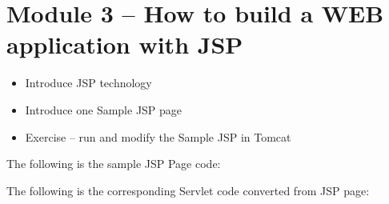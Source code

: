 \section{Module 3 -- How to build a WEB application with JSP
}
\begin{itemize}
\item Introduce JSP technology
\item Introduce one Sample JSP page
\item Exercise -- run and modify the Sample JSP in Tomcat
\end{itemize}

The following is the sample JSP Page code:
\begin{quote}
\small

\end{quote}

The following is the corresponding Servlet code converted from JSP page:
\begin{quote}
\small

\end{quote}